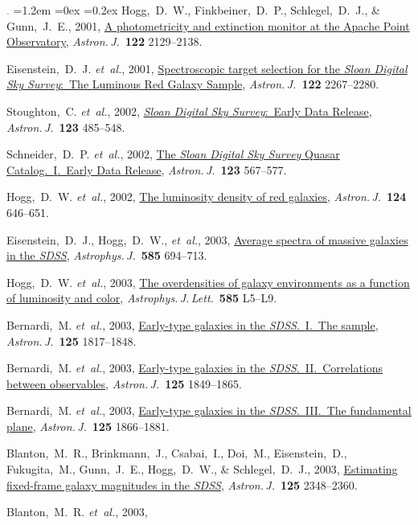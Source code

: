 \documentclass[10pt,letterpaper]{article}
\newcommand{\acronym}[1]{{\small{#1}}}
\newcommand{\foreign}[1]{\textsl{#1}}
\newcommand{\etal}{\foreign{et~al.}}
\newcommand{\project}[1]{\textsl{#1}}
\newcommand{\doi}[2]{\href{http://dx.doi.org/#1}{{#2}}}
\newcommand{\deemph}[1]{\textcolor{grey}{\footnotesize{#1}}}
\newcommand{\pubnumber}[1]{\deemph{{#1}.}}
\newcounter{refpubnum}
\newcommand{\hogglist}{%
    \rightmargin=0in
    \leftmargin=1.2em
    \topsep=0ex
    \partopsep=0pt
    \itemsep=0.2ex
    \parsep=0pt
    \itemindent=-1.0\leftmargin
    \listparindent=0.0\leftmargin
    \settowidth{\labelsep}{~}
    \usecounter{refpubnum}
  }
\begin{document}
\begin{list}{\pubnumber{\therefpubnum}}{\hogglist}
Hogg,~D.~W., Finkbeiner,~D.~P., Schlegel,~D.~J., \& Gunn,~J.~E., 2001,
\doi{10.1086/323103}{A photometricity and extinction monitor at the Apache Point Observatory},
\textit{Astron.\,J.}\ \textbf{122} 2129--2138.
\item
Eisenstein,~D.~J. \etal, 2001,
\doi{10.1086/323717}{Spectroscopic target selection for the \project{Sloan Digital Sky Survey}:\ The Luminous Red Galaxy Sample},
\textit{Astron.\,J.}\ \textbf{122} 2267--2280.
\item
Stoughton,~C. \etal, 2002,
\doi{10.1086/324741}{\project{Sloan Digital Sky Survey}:\ Early Data Release},
\textit{Astron.\,J.}\ \textbf{123} 485--548.
\item
Schneider,~D.~P. \etal, 2002,
\doi{10.1086/338434}{The \project{Sloan Digital Sky Survey} Quasar Catalog.\ \acronym{I}.\ Early Data Release},
\textit{Astron.\,J.}\ \textbf{123} 567--577.
\item
Hogg,~D.~W. \etal, 2002,
\doi{10.1086/341392}{The luminosity density of red galaxies},
\textit{Astron.\,J.}\ \textbf{124} 646--651.
\item
Eisenstein,~D.~J., Hogg,~D.~W., \etal, 2003,
\doi{10.1086/346233}{Average spectra of massive galaxies in the \project{\acronym{SDSS}}},
\textit{Astrophys.\,J.}\ \textbf{585} 694--713.
\item
Hogg,~D.~W. \etal, 2003,
\doi{10.1086/374238}{The overdensities of galaxy environments as a function of luminosity and color},
\textit{Astrophys.\,J.\,Lett.}\
\textbf{585} L5--L9.
\item
Bernardi,~M. \etal, 2003,
\doi{10.1086/367776}{Early-type galaxies in the \project{\acronym{SDSS}}.\ \acronym{I}.\ The sample},
\textit{Astron.\,J.}\ \textbf{125} 1817--1848.
\item
Bernardi,~M. \etal, 2003,
\doi{10.1086/374256}{Early-type galaxies in the \project{\acronym{SDSS}}.\ \acronym{II}.\ Correlations between observables},
\textit{Astron.\,J.}\ \textbf{125} 1849--1865.
\item
Bernardi,~M. \etal, 2003,
\doi{10.1086/367794}{Early-type galaxies in the \project{\acronym{SDSS}}.\ \acronym{III}.\ The fundamental plane},
\textit{Astron.\,J.}\ \textbf{125} 1866--1881.
\item
Blanton,~M.~R., Brinkmann,~J., Csabai,~I., Doi,~M., Eisenstein,~D., Fukugita,~M., Gunn,~J.~E., Hogg,~D.~W., \& Schlegel,~D.~J., 2003,
\doi{10.1086/342935}{Estimating fixed-frame galaxy magnitudes in the \project{\acronym{SDSS}}},
\textit{Astron.\,J.}\ \textbf{125} 2348--2360.
\item
Blanton,~M.~R. \etal, 2003,

\end{list}
\end{document}
